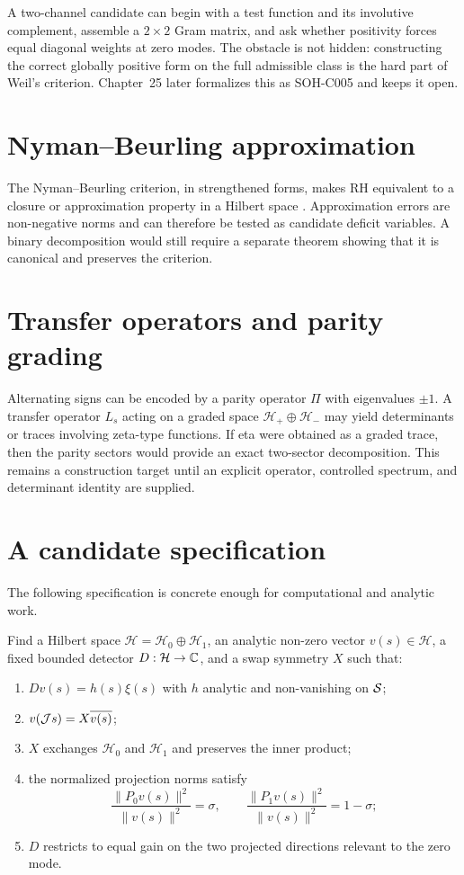 A two-channel candidate can begin with a test function and its involutive complement, assemble a $2\times2$ Gram matrix, and ask whether positivity forces equal diagonal weights at zero modes. The obstacle is not hidden: constructing the correct globally positive form on the full admissible class is the hard part of Weil's criterion. Chapter~25 later formalizes this as SOH-C005 and keeps it open.

\section{Nyman--Beurling approximation}

The Nyman--Beurling criterion, in strengthened forms, makes RH equivalent to a closure or approximation property in a Hilbert space \citep{baezduarte2003}. Approximation errors are non-negative norms and can therefore be tested as candidate deficit variables. A binary decomposition would still require a separate theorem showing that it is canonical and preserves the criterion.

\section{Transfer operators and parity grading}

Alternating signs can be encoded by a parity operator $\Pi$ with eigenvalues $\pm1$. A transfer operator $L_s$ acting on a graded space $\mathcal H_+\oplus\mathcal H_-$ may yield determinants or traces involving zeta-type functions. If eta were obtained as a graded trace, then the parity sectors would provide an exact two-sector decomposition. This remains a construction target until an explicit operator, controlled spectrum, and determinant identity are supplied.

\section{A candidate specification}

The following specification is concrete enough for computational and analytic work.

\begin{problem}
Find a Hilbert space $\mathcal H=\mathcal H_0\oplus\mathcal H_1$, an analytic non-zero vector $v(s)\in\mathcal H$, a fixed bounded detector $D:\mathcal H\to\mathbb{C}$, and a swap symmetry $X$ such that:
\begin{enumerate}
  \item $Dv(s)=h(s)\xi(s)$ with $h$ analytic and non-vanishing on $\mathcal{S}$;
  \item $v(\mathcal{J} s)=X\overline{v(s)}$;
  \item $X$ exchanges $\mathcal H_0$ and $\mathcal H_1$ and preserves the inner product;
  \item the normalized projection norms satisfy
  \[
   \frac{\|P_0v(s)\|^2}{\|v(s)\|^2}=\sigma,
   \qquad
   \frac{\|P_1v(s)\|^2}{\|v(s)\|^2}=1-\sigma;
  \]
  \item $D$ restricts to equal gain on the two projected directions relevant to the zero mode.
\end{enumerate}
\end{problem}

